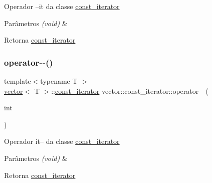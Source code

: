 Operador --it da classe \mbox{\hyperlink{classsc_1_1vector_1_1const__iterator}{const\+\_\+iterator}} 
\begin{DoxyParams}{Parâmetros}
{\em (void)} & \\
\hline
\end{DoxyParams}
\begin{DoxyReturn}{Retorna}
\mbox{\hyperlink{classsc_1_1vector_1_1const__iterator}{const\+\_\+iterator}} 
\end{DoxyReturn}
\mbox{\label{classsc_1_1vector_1_1const__iterator_a1fa24070f4f30fea4d34bb9a6c669f3e}} 
\subsubsection{\texorpdfstring{operator-\/-\/()}{operator--()}\hspace{0.1cm}{\footnotesize\ttfamily [2/2]}}
{\footnotesize\ttfamily template$<$typename T $>$ \\
\mbox{\hyperlink{classsc_1_1vector}{vector}}$<$ T $>$\+::\mbox{\hyperlink{classsc_1_1vector_1_1const__iterator}{const\+\_\+iterator}} vector\+::const\+\_\+iterator\+::operator-\/-\/ (\begin{DoxyParamCaption}\item[{int}]{ }\end{DoxyParamCaption})}

Operador it-- da classe \mbox{\hyperlink{classsc_1_1vector_1_1const__iterator}{const\+\_\+iterator}} 
\begin{DoxyParams}{Parâmetros}
{\em (void)} & \\
\hline
\end{DoxyParams}
\begin{DoxyReturn}{Retorna}
\mbox{\hyperlink{classsc_1_1vector_1_1const__iterator}{const\+\_\+iterator}} 
\end{DoxyReturn}
\mbox{\label{classsc_1_1vector_1_1const__iterator_a2122dfbc461d6bc1f18690cb9ad08353}} 
